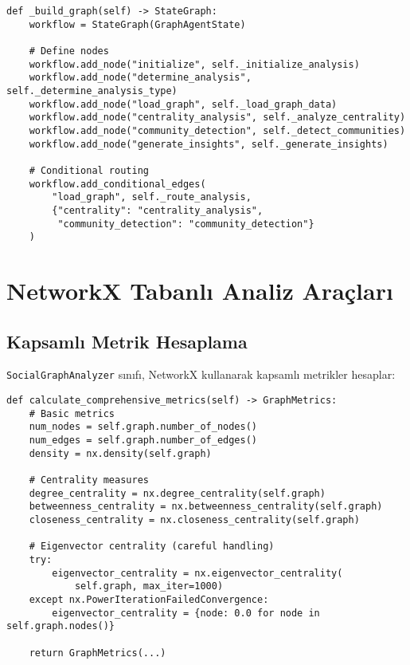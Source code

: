 \documentclass[conference]{IEEEtran}
\begin{document}
\begin{lstlisting}[caption=LangGraph Workflow Creation]
def _build_graph(self) -> StateGraph:
    workflow = StateGraph(GraphAgentState)
    
    # Define nodes
    workflow.add_node("initialize", self._initialize_analysis)
    workflow.add_node("determine_analysis", self._determine_analysis_type)
    workflow.add_node("load_graph", self._load_graph_data)
    workflow.add_node("centrality_analysis", self._analyze_centrality)
    workflow.add_node("community_detection", self._detect_communities)
    workflow.add_node("generate_insights", self._generate_insights)
    
    # Conditional routing
    workflow.add_conditional_edges(
        "load_graph", self._route_analysis,
        {"centrality": "centrality_analysis",
         "community_detection": "community_detection"}
    )
\end{lstlisting}

\section{NetworkX Tabanlı Analiz Araçları}

\subsection{Kapsamlı Metrik Hesaplama}

\texttt{SocialGraphAnalyzer} sınıfı, NetworkX kullanarak kapsamlı metrikler hesaplar:

\begin{lstlisting}[caption=Comprehensive Metrics Calculation]
def calculate_comprehensive_metrics(self) -> GraphMetrics:
    # Basic metrics
    num_nodes = self.graph.number_of_nodes()
    num_edges = self.graph.number_of_edges()
    density = nx.density(self.graph)
    
    # Centrality measures
    degree_centrality = nx.degree_centrality(self.graph)
    betweenness_centrality = nx.betweenness_centrality(self.graph)
    closeness_centrality = nx.closeness_centrality(self.graph)
    
    # Eigenvector centrality (careful handling)
    try:
        eigenvector_centrality = nx.eigenvector_centrality(
            self.graph, max_iter=1000)
    except nx.PowerIterationFailedConvergence:
        eigenvector_centrality = {node: 0.0 for node in self.graph.nodes()}
    
    return GraphMetrics(...)
\end{lstlisting}
\end{document}
